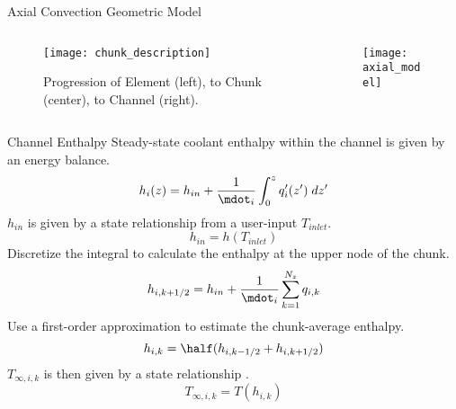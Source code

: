 \begin{frame}{Axial Convection Geometric Model}
  \begin{columns}
    \begin{column}{0.5\textwidth}
      \begin{figure}
        \centering
        \texttt{[image: chunk\_description]}
        \caption{Progression of Element (left), to Chunk (center), to Channel
          (right).}
        \label{fig:chunk_description}
      \end{figure}
    \end{column}
    \begin{column}{0.5\textwidth}
      \begin{figure}
        \centering
        \texttt{[image: axial\_model]}
        \label{fig:axial_model}
      \end{figure}
    \end{column}
  \end{columns}
\end{frame}

\begin{frame}{Channel Enthalpy}
  Steady-state coolant enthalpy within the channel is given by an energy
  balance.
  \begin{equation}
    \label{eq:continuous_heat_balance}
    h_i(z) = h_{in} + \frac{1}{\mdot_i} \int_0^z q'_i(z') \; dz'
  \end{equation}
  $h_{in}$ is given by a state relationship from a user-input $T_{inlet}$.
  \begin{equation}
    h_{in} = h(T_{inlet})
  \end{equation}
  Discretize the integral to calculate the enthalpy at the upper node of the
  chunk.
  \begin{equation}
    h_{i,k+1/2} = h_{in} + \frac{1}{\mdot_i} \sum_{k=1}^{N_z} q_{i,k}
  \end{equation}
  Use a first-order approximation to estimate the chunk-average enthalpy.
  \begin{equation}
    h_{i,k} = \half (h_{i,k-1/2}+h_{i,k+1/2})
  \end{equation}
  $T_{\infty,i,k}$ is then given by a state relationship \cite{sodiumProp}.
  \begin{equation}
    T_{\infty,i,k} = T(h_{i,k})
  \end{equation}
\end{frame}

